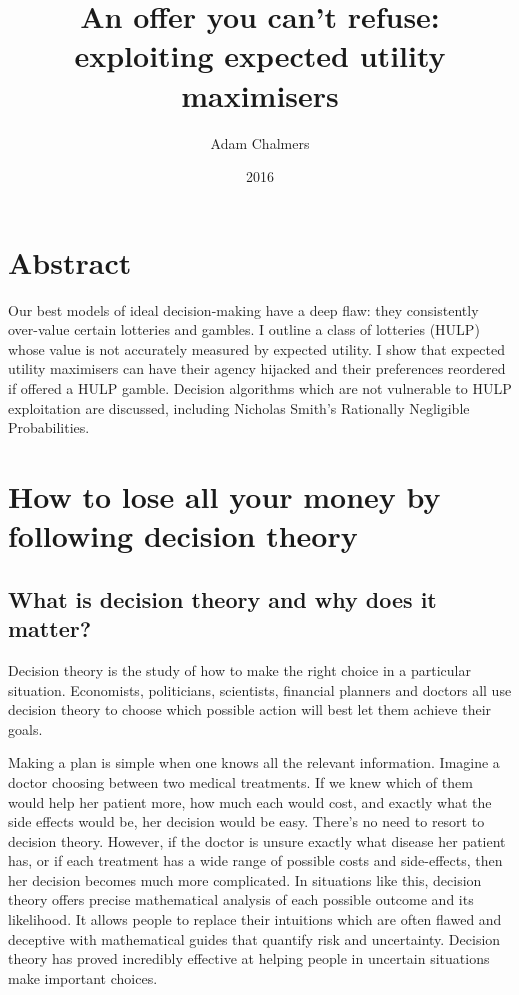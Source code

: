 \documentclass{article}
\title{An offer you can't refuse: exploiting expected utility maximisers}
\author{Adam Chalmers}
\date{2016}
\begin{document}
\frenchspacing
\onehalfspacing
\maketitle


\section{Abstract}
Our best models of ideal decision-making have a deep flaw: they consistently over-value certain lotteries and gambles. I outline a class of lotteries (HULP) whose value is not accurately measured by expected utility. I show that expected utility maximisers can have their agency hijacked and their preferences reordered if offered a HULP gamble. Decision algorithms which are not vulnerable to HULP exploitation are discussed, including Nicholas Smith's Rationally Negligible Probabilities.

\section{How to lose all your money by following decision theory}
\subsection{What is decision theory and why does it matter?}

Decision theory is the study of how to make the right choice in a particular situation. Economists, politicians, scientists, financial planners and doctors all use decision theory to choose which possible action will best let them achieve their goals.

Making a plan is simple when one knows all the relevant information. Imagine a doctor choosing between two medical treatments. If we knew which of them would help her patient more, how much each would cost, and exactly what the side effects would be, her decision would be easy. There's no need to resort to decision theory. However, if the doctor is unsure exactly what disease her patient has, or if each treatment has a wide range of possible costs and side-effects, then her decision becomes much more complicated. In situations like this, decision theory offers precise mathematical analysis of each possible outcome and its likelihood. It allows people to replace their intuitions \textemdash which are often flawed and deceptive \textemdash with mathematical guides that quantify risk and uncertainty. Decision theory has proved incredibly effective at helping people in uncertain situations make important choices. 
\end{document}
